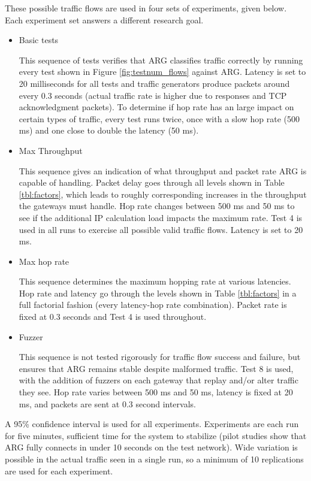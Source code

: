 \par These possible traffic flows are used in four sets of experiments, given below. Each experiment set answers a different research goal.
\begin{itemize}
	\item Basic tests
	\par This sequence of tests verifies that \ac{ARG} classifies traffic correctly by running every test shown in Figure \ref{fig:testnum_flows} against \ac{ARG}. Latency is set to 20 milliseconds for all tests and traffic generators produce packets around every 0.3 seconds (actual traffic rate is higher due to responses and \ac{TCP} acknowledgment packets). To determine if hop rate has an large impact on certain types of traffic, every test runs twice, once with a slow hop rate (500 ms) and one close to double the latency (50 ms).

	\item Max Throughput
	\par This sequence gives an indication of what throughput and packet rate \ac{ARG} is capable of handling. Packet delay goes through all levels shown in Table \ref{tbl:factors}, which leads to roughly corresponding increases in the throughput the gateways must handle. Hop rate changes between 500 ms and 50 ms to see if the additional \ac{IP} calculation load impacts the maximum rate. Test 4 is used in all runs to exercise all possible valid traffic flows. Latency is set to 20 ms.

	\item Max hop rate
	\par This sequence determines the maximum hopping rate at various latencies. Hop rate and latency go through the levels shown in Table \ref{tbl:factors} in a full factorial fashion (every latency-hop rate combination). Packet rate is fixed at 0.3 seconds and Test 4 is used throughout.

	\item Fuzzer
	\par This sequence is not tested rigorously for traffic flow success and failure, but ensures that \ac{ARG} remains stable despite malformed traffic. Test 8 is used, with the addition of fuzzers on each gateway that replay and/or alter traffic they see. Hop rate varies between 500 ms and 50 ms, latency is fixed at 20 ms, and packets are sent at 0.3 second intervals.
\end{itemize}

\par A 95\% confidence interval is used for all experiments. Experiments are each run for five minutes, sufficient time for the system to stabilize (pilot studies show that \ac{ARG} fully connects in under 10 seconds on the test network). Wide variation is possible in the actual traffic seen in a single run, so a minimum of 10 replications are used for each experiment.

